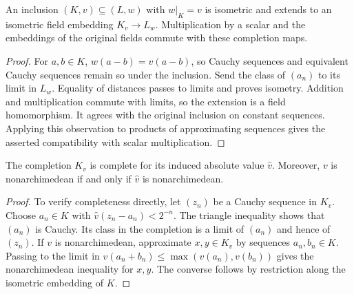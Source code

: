 \begin{lemma}\label{lem:completion-embedding}
\leanok
{}
An inclusion $(K,v)\subseteq(L,w)$ with $w|_K=v$ is isometric and extends
to an isometric field embedding $K_v\to L_w$. Multiplication by a scalar
and the embeddings of the original fields commute with these completion maps.
\end{lemma}
\begin{proof}
For $a,b\in K$, $w(a-b)=v(a-b)$, so Cauchy sequences and equivalent
Cauchy sequences remain so under the inclusion. Send the class of $(a_n)$
to its limit in $L_w$. Equality of distances passes to limits and proves
isometry. Addition and multiplication commute with limits, so the extension
is a field homomorphism. It agrees with the original inclusion on constant
sequences. Applying this observation to products of approximating sequences
gives the asserted compatibility with scalar multiplication.
\end{proof}

\begin{lemma}
\label{lem:completion-nonarchimedean}
\leanok
{}
The completion $K_v$ is complete for its induced absolute value $\widehat v$.
Moreover, $v$ is nonarchimedean if and only if $\widehat v$ is
nonarchimedean.
\end{lemma}
\begin{proof}
To verify completeness directly, let $(z_n)$ be a Cauchy sequence in $K_v$.
Choose $a_n\in K$ with $\widehat v(z_n-a_n)<2^{-n}$. The triangle
inequality shows that $(a_n)$ is Cauchy. Its class in the completion is a
limit of $(a_n)$ and hence of $(z_n)$. If $v$ is nonarchimedean, approximate
$x,y\in K_v$ by sequences $a_n,b_n\in K$. Passing to the limit in
$v(a_n+b_n)\leq\max(v(a_n),v(b_n))$ gives the nonarchimedean inequality
for $x,y$. The converse follows by restriction along the isometric
embedding of $K$.
\end{proof}

